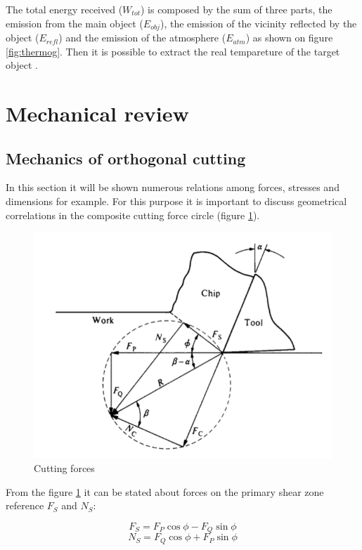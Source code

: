 	The total energy received ($W_{tot}$) is composed by the sum of three parts, the emission from the main object ($E_{obj}$), the emission of the vicinity reflected by the object ($E_{refl}$) and the emission of the atmosphere ($E_{atm}$) as shown on figure \ref{fig:thermog}. Then it is possible to extract the real tempareture of the target object \cite{usamentiaga2014}.


\section{Mechanical review}
	\subsection{Mechanics of orthogonal cutting}

	In this section it will be shown numerous relations among forces, stresses and dimensions for example. For this purpose it is important to discuss geometrical correlations in the composite cutting force circle (figure \ref{fig:circlec}).

	\begin{figure}[h]
		\centering
		\captionsetup{justification=centering}
		\includegraphics[scale=0.5]{Cap1/circlec.png}
		\caption{Cutting forces \cite{shaw2005metal}}
		\label{fig:circlec}
	\end{figure}

	From the figure \ref{fig:circlec} it can be stated about forces on the primary shear zone reference $F_{S}$ and $N_{S}$:

	\begin{equation} 
	\label{}
	F_{S} = F_{P}\cos\phi - F_{Q}\sin\phi
	\end{equation}
	\begin{equation} 
	\label{}
	N_{S} = F_{Q}\cos\phi + F_{P}\sin\phi
	\end{equation}

